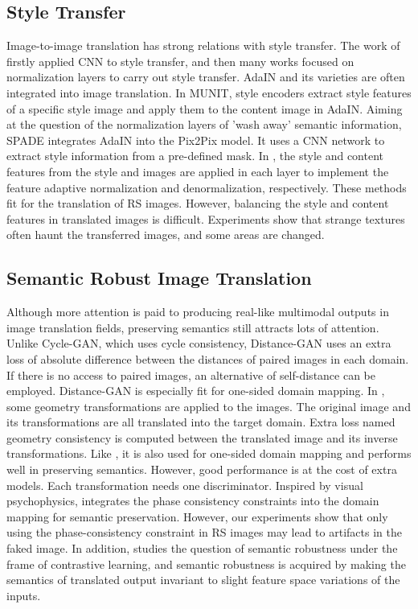 \subsection{Style Transfer}\label{sec2.3}
Image-to-image translation has strong relations with style transfer. The work of \cite{Gatys:CVPR2016} firstly applied CNN to style transfer, and then many works focused on normalization layers to carry out style transfer. AdaIN\cite{Huang:ICCV2017} and its varieties are often integrated into image translation\cite{Huang:ECCV2018,DBLP:Kim2019,Park:CVPR2019,Jiang:ECCV2020}. In MUNIT\cite{Huang:ECCV2018}, style encoders extract style features of a specific style image and apply them to the content image in AdaIN. Aiming at the question of the normalization layers of 'wash away' semantic information, SPADE\cite{Park:CVPR2019} integrates AdaIN into the Pix2Pix model. It uses a CNN network to extract style information from a pre-defined mask. In \cite{Jiang:ECCV2020}, the style and content features from the style and images are applied in each layer to implement the feature adaptive normalization and denormalization, respectively. These methods fit for the translation of RS images. However, balancing the style and content features in translated images is difficult. Experiments show that strange textures often haunt the transferred images, and some areas are changed.

\subsection{Semantic Robust Image Translation}\label{sec2.4}
Although more attention is paid to producing real-like multimodal outputs in image translation fields, preserving semantics still attracts lots of attention. Unlike Cycle-GAN, which uses cycle consistency, Distance-GAN\cite{Benaim:NIPS2017} uses an extra loss of absolute difference between the distances of paired images in each domain. If there is no access to paired images, an alternative of self-distance can be employed\cite{Benaim:NIPS2017}. Distance-GAN is especially fit for one-sided domain mapping. In \cite{Fu:CVPR2019}, some geometry transformations are applied to the images. The original image and its transformations are all translated into the target domain. Extra loss named geometry consistency is computed between the translated image and its inverse transformations. Like \cite{Benaim:NIPS2017}, it is also used for one-sided domain mapping and performs well in preserving semantics. However, good performance is at the cost of extra models. Each transformation needs one discriminator. Inspired by visual psychophysics, \cite{Yang:CVPR2020} integrates the phase consistency constraints into the domain mapping for semantic preservation. However, our experiments show that only using the phase-consistency constraint in RS images may lead to artifacts in the faked image. In addition, \cite{Jia:ICCV2021} studies the question of semantic robustness under the frame of contrastive learning\cite{Park:ECCV2020}, and semantic robustness is acquired by making the semantics of translated output invariant to slight feature space variations of the inputs.

